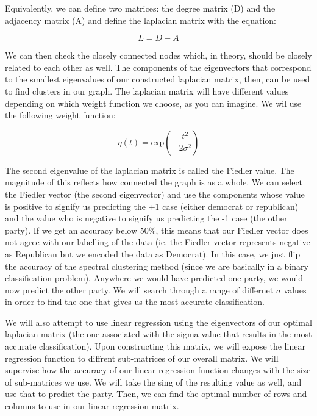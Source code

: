 \documentclass[11pt]{amsart}
\begin{document}
Equivalently, we can define two matrices: the degree matrix (D) and the adjacency matrix (A) and define the laplacian 
matrix with the equation:

\[L = D - A\]

We can then check the closely connected nodes which, in theory, should be 
closely related to each other as well. The components of the eigenvectors that correspond 
to the smallest eigenvalues of our constructed laplacian matrix, then, can be used 
to find clusters in our graph. The laplacian matrix will have different values depending 
on which weight function we choose, as you can imagine. We wil use the following weight function: 

\[\eta(t) = \text{exp}(-\frac{t^2}{2\sigma^2})\]

The second eigenvalue of the laplacian matrix is called the Fiedler value. The magnitude of this 
reflects how connected the graph is as a whole. We can select the Fiedler vector (the second eigenvector)
and use the components whose value is positive to signify us predicting the +1 case (either democrat or republican)
and the value who is negative to signify us predicting the -1 case (the other party). If we get an accuracy below 50\%, 
this means that our Fiedler vector does not agree with our labelling of the data (ie. the Fiedler vector represents
negative as Republican but we encoded the data as Democrat). In this case, we just flip the accuracy of the spectral 
clustering method (since we are basically in a binary classification problem). Anywhere we would have predicted 
one party, we would now predict the other party. We will search through a range of differnet $\sigma$ values 
in order to find the one that gives us the most accurate classification.

We will also attempt to use linear regression using the eigenvectors of our optimal laplacian matrix
(the one associated with the sigma value that results in the most accurate classification). Upon constructing this 
matrix, we will expose the linear regression function to diffrent sub-matrices of our overall matrix. We will supervise 
how the accuracy of our linear regression function changes with the size of sub-matrices we use. We will take the sing 
of the resulting value as well, and use that to predict the party. Then, we can 
find the optimal number of rows and columns to use in our linear regression matrix.
\end{document}
